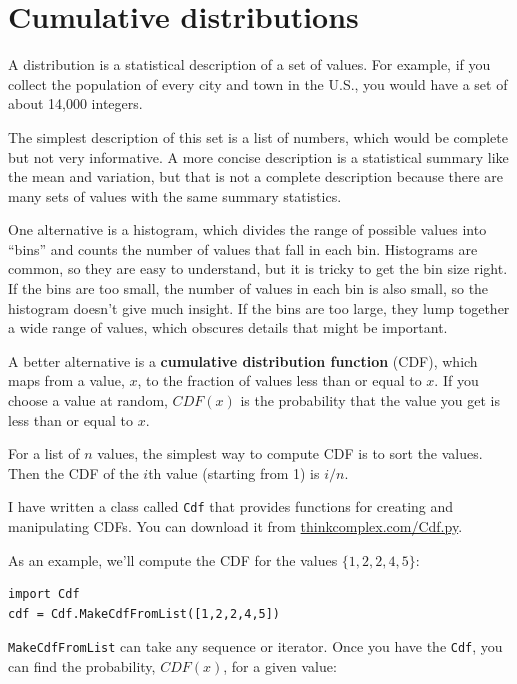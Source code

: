 \documentclass[10pt]{book}
\begin{document}
\section{Cumulative distributions}

A distribution is a statistical description of a set of values.
For example, if you collect the population of every city and town
in the U.S., you would have a set of about 14,000 integers.

The simplest description of this set is a list of numbers, which
would be complete but not very informative.  A more concise description
is a statistical summary like the mean and variation, but
that is not a complete description because there are many sets
of values with the same summary statistics.

One alternative is a histogram, which divides the range of
possible values into ``bins'' and counts the number of values that
fall in each bin.  Histograms are common, so they are
easy to understand, but it is tricky to get the bin size right.  If the bins
are too small, the number of values in each bin is also small,
so the histogram doesn't give much insight.  If the bins are
too large, they lump together a wide range of values, which
obscures details that might be important.

A better alternative is a {\bf cumulative distribution function}
(CDF), which maps from a value, $x$, to the fraction of values less
than or equal to $x$.  If you choose a value at random, $CDF(x)$
is the probability that the value you get is less
than or equal to $x$.

For a list of $n$ values, the simplest way to compute CDF is to
sort the values.  Then the CDF of the $i$th value (starting from 1)
is $i/n$.

I have written a class called {\tt Cdf} that provides functions
for creating and manipulating CDFs.  You can download it from
\url{thinkcomplex.com/Cdf.py}.

As an example, we'll compute the CDF for the values $\{1,2,2,4,5\}$:

\begin{verbatim}
import Cdf
cdf = Cdf.MakeCdfFromList([1,2,2,4,5])
\end{verbatim}

{\tt MakeCdfFromList} can take any sequence or iterator.
Once you have the {\tt Cdf}, you can find the probability, $CDF(x)$, for
a given value:
\end{document}
